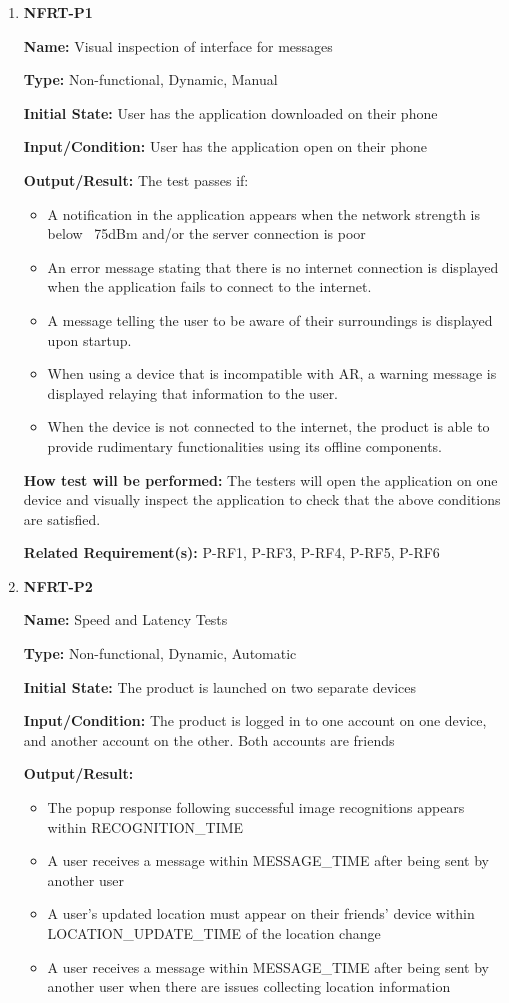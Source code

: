 \documentclass[12pt, titlepage]{article}
\begin{document}
\begin{enumerate}
\item{\textbf{NFRT-P1}}

\textbf{Name:} Visual inspection of interface for messages

\textbf{Type:} Non-functional, Dynamic, Manual
					
\textbf{Initial State:} User has the application downloaded on their phone
					
\textbf{Input/Condition:} User has the application open on their phone
					
\textbf{Output/Result:} The test passes if:
\begin{itemize}
  \item A notification in the application appears when the network strength is below ~75dBm and/or the server connection is poor
  \item An error message stating that there is no internet connection is displayed when the application fails to connect to the internet.
  \item A message telling the user to be aware of their surroundings is displayed upon startup.
  \item When using a device that is incompatible with AR, a warning message is displayed relaying that information to the user.
  \item When the device is not connected to the internet, the product is able to provide rudimentary functionalities using its offline components.
\end{itemize}

\textbf{How test will be performed:} The testers will open the application on one device and visually inspect the application to check that the above conditions are satisfied.

\textbf{Related Requirement(s):} P-RF1, P-RF3, P-RF4, P-RF5, P-RF6

\item{\textbf{NFRT-P2}}

\textbf{Name:} Speed and Latency Tests

\textbf{Type:} Non-functional, Dynamic, Automatic
					
\textbf{Initial State:} The product is launched on two separate devices

\textbf{Input/Condition:} The product is logged in to one account on one device, and another account on the other. Both accounts are friends

\textbf{Output/Result:}
\begin{itemize}
  \item The popup response following successful image recognitions appears within RECOGNITION\_TIME
  \item A user receives a message within MESSAGE\_TIME after being sent by another user
  \item A user's updated location must appear on their friends' device within LOCATION\_UPDATE\_TIME of the location change
  \item A user receives a message within MESSAGE\_TIME after being sent by another user when there are issues collecting location information
\end{itemize}


\end{enumerate}
\end{document}
